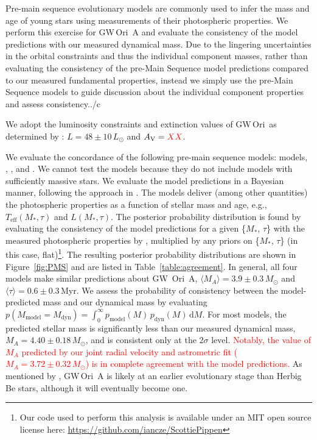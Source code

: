 \documentclass[twocolumn]{aastex61}
\newcommand{\todo}[1]{ \textcolor{red}{#1}}
\newcommand{\gw}{GW\,Ori}
\newcommand{\obj}{\gw}
\begin{document}


Pre-main sequence evolutionary models are commonly used to infer the mass and age of young stars using measurements of their photospheric properties. We perform this exercise for \gw~A and evaluate the consistency of the model predictions with our measured dynamical mass. Due to the lingering uncertainties in the orbital constraints and thus the individual component masses, rather than evaluating the consistency of the pre-Main Sequence model predictions compared to our measured fundamental properties, instead we simply use the pre-Main Sequence models to guide discussion about the individual component properties and assess consistency../c

We adopt the luminosity constraints and extinction values of \obj\ as determined by \citet{fang14}: $L = 48 \pm 10\,L_\odot$ and $A_\mathrm{V} = \todo{XX}$.



We evaluate the concordance of the following pre-main sequence models: \citet{choi16} models, \citet{dotter08}, \citet{tognelli11}, and \citet{siess00}. We cannot test the \citet{baraffe15} models because they do not include models with sufficiently massive stars. We evaluate the model predictions in a Bayesian manner, following the approach in \citet{jorgensen05,rosenfeld12b,czekala15a}. The models deliver (among other quantities) the photospheric properties as a function of stellar mass and age,
e.g., $T_\mathrm{eff}(M_\ast, \tau)$ and $L(M_\ast, \tau)$.
The posterior probability distribution is found by evaluating the consistency of the model predictions for a given \{$M_\ast$, $\tau$\} with the measured photospheric properties by \citet{fang14}, multiplied by any priors on  \{$M_\ast$, $\tau$\} (in this case, flat)\footnote{Our code used to perform this analysis is available under an MIT open source license here: \url{https://github.com/iancze/ScottiePippen}}.
The resulting posterior probability distributions are shown in Figure~\ref{fig:PMS} and are listed in Table~\ref{table:agreement}. In general, all four models make similar predictions about GW~Ori~A, $\langle M_A \rangle = 3.9 \pm 0.3\,M_\odot$ and $\langle \tau \rangle = 0.6 \pm 0.3\,$Myr. We assess the probability of consistency between the model-predicted mass and our dynamical mass by evaluating $p(M_\mathrm{model} = M_\mathrm{dyn}) = \int_0^\infty p_\mathrm{model}(M) \, p_\mathrm{dyn}(M) \, \mathrm{d}M$. For most models, the predicted stellar mass is significantly less than our measured dynamical mass, $M_A = 4.40 \pm 0.18\,M_\odot$, and is consistent only at the $2\sigma$ level. \todo{Notably, the value of $M_A$ predicted by our joint radial velocity and astrometric fit ($M_A = 3.72 \pm 0.32\,M_\odot$) is in complete agreement with the model predictions.} As mentioned by \citet{fang14}, \gw~A is likely at an earlier evolutionary stage than Herbig Be stars, although it will eventually become one.
\end{document}
